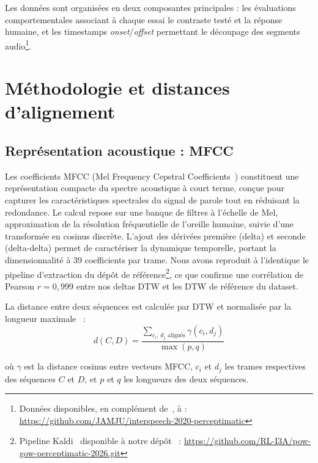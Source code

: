 \documentclass{article}
\begin{document}
Les données sont organisées en deux composantes principales : les évaluations
comportementales associant à chaque essai le contraste testé et la réponse
humaine, et les timestamps \textit{onset}/\textit{offset}
permettant le découpage des segments audio\footnote{Données disponibles, en
complément de~\cite{perceptimatic2020}, à :~\cite{github_perceptimatic}
\url{https://github.com/JAMJU/interspeech-2020-perceptimatic}}.

\section{Méthodologie et distances d'alignement}
\label{sec:methodo}

\subsection{Représentation acoustique : MFCC}

Les coefficients MFCC (Mel Frequency Cepstral Coefficients~\cite{mfcc})
constituent une représentation compacte du spectre acoustique à court terme,
conçue pour capturer les caractéristiques spectrales du signal de parole
tout en réduisant la redondance. Le calcul repose sur une banque de filtres
à l'échelle de Mel, approximation de la résolution fréquentielle de
l'oreille humaine,  suivie d'une transformée en cosinus discrète. L'ajout
des dérivées première (delta) et seconde (delta-delta) permet de caractériser
la dynamique temporelle, portant la dimensionnalité à 39 coefficients par
trame. Nous avons reproduit à l'identique le pipeline d'extraction du dépôt
de référence\footnote{\label{fn:repo}Pipeline Kaldi~\cite{kaldi} disponible à notre
dépôt~\cite{github_project} :
\url{https://github.com/RL-I3A/pow-gow-perceptimatic-2026.git}}, ce que
confirme une corrélation de Pearson $r = 0{,}999$ entre nos deltas DTW et
les DTW de référence du dataset.

La distance entre deux séquences est calculée par DTW et normalisée par la
longueur maximale~\cite{perceptimatic2020} :
\begin{equation}
d(C, D) = \frac{\displaystyle\sum_{c_i,\, d_j \text{ alignés}} \gamma(c_i,
d_j)}{\max(p, q)}
\label{eq:dtw}
\end{equation}

où $\gamma$ est la distance cosinus entre vecteurs MFCC, $c_i$ et $d_j$ les
trames respectives des séquences $C$ et $D$, et $p$ et $q$ les longueurs des
deux séquences.
\end{document}
